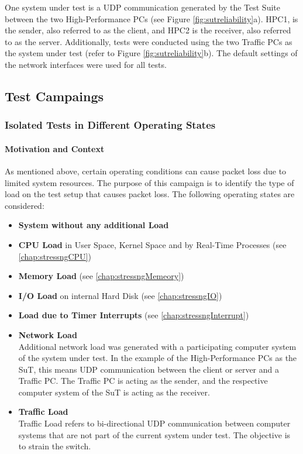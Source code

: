 One system under test is a UDP communication generated by the Test Suite between the two High-Performance PCs (see Figure \ref{fig:sutreliability}a). HPC1, is the sender, also referred to as the client, and HPC2 is the receiver, also referred to as the server. Additionally, tests were conducted using the two Traffic PCs as the system under test (refer to Figure \ref{fig:sutreliability}b). The default settings of the network interfaces were used for all tests.

\subsection{Test Campaings}

\subsubsection{Isolated Tests in Different Operating States} \label{chap:relcamp1}
\paragraph{Motivation and Context}

As mentioned above, certain operating conditions can cause packet loss due to limited system resources. The purpose of this campaign is to identify the type of load on the test setup that causes packet loss. The following operating states are considered:

\begin{itemize}
  \item \textbf{System without any additional Load}
  \item \textbf{CPU Load} in User Space, Kernel Space and by Real-Time Processes (see \ref{chap:stressngCPU})
  \item \textbf{Memory Load} (see \ref{chap:stressngMemeory})
  \item \textbf{I/O Load} on internal Hard Disk (see \ref{chap:stressngIO})
  \item \textbf{Load due to Timer Interrupts} (see \ref{chap:stressngInterrupt})
  \item \textbf{Network Load} \\
  		Additional network load was generated with a participating computer system of the system under test. In the example of the High-Performance PCs as the SuT, this means UDP communication between the client or server and a Traffic PC. The Traffic PC is acting as the sender, and the respective computer system of the SuT is acting as the receiver.
  		
  \item \textbf{Traffic Load} \\
 		Traffic Load refers to bi-directional UDP communication between computer systems that are not part of the current system under test. The objective is to strain the switch.
\end{itemize}

